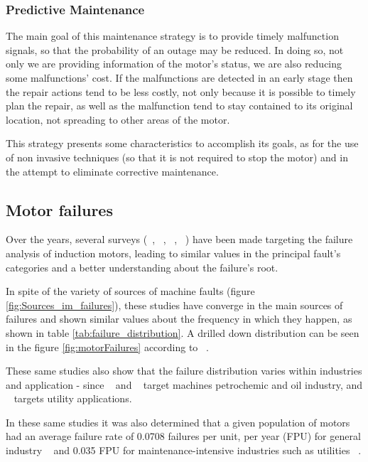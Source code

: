 \subsubsection{Predictive Maintenance}
\label{subsubsec:predictive_maintenance}
The main goal of this maintenance strategy is to provide timely malfunction signals, so that the probability of an outage may be reduced. In doing so, not only we are providing information of the motor's status, we are also reducing some malfunctions' cost. 
If the malfunctions are detected in an early stage then the repair actions tend to be less costly, not only because it is possible to timely plan the repair, as well as the malfunction tend to stay contained to its original location, not spreading to other areas of the motor. 

This strategy presents some characteristics to accomplish its goals, as for the use of non invasive techniques (so that it is not required to stop the motor) and in the attempt to eliminate corrective maintenance. 


\subsection{Motor failures}
\label{subsec:motor_failures}

Over the years, several surveys (~\cite{Bonnett2010}, ~\cite{Thorsen1995}, ~\cite{Mccoy1986}, ~\cite{Bonnett1992}) have been made targeting the failure analysis of induction motors, leading to similar values in the principal fault's categories and a better understanding about the failure's root.

In spite of the variety of sources of machine faults (figure \ref{fig:Sources_im_failures}), these studies have converge in the main sources of failures and shown similar values about the frequency in which they happen, as shown in table \ref{tab:failure_distribution}. A drilled down distribution can be seen in the figure \ref{fig:motorFailures} according to ~\cite{Mccoy1986}.

These same studies also show that the failure distribution varies within industries and application - since ~\cite{Bonnett2010} and ~\cite{Thorsen1995} target machines petrochemic and oil industry, and ~\cite{Mccoy1986} targets utility applications.


In these same studies it was also determined that a given population of motors had an average failure rate of 0.0708 failures per unit, per year (FPU) for general industry ~\cite{Reliability1987} and 0.035 FPU for maintenance-intensive industries such as utilities ~\cite{Mccoy1986}.

